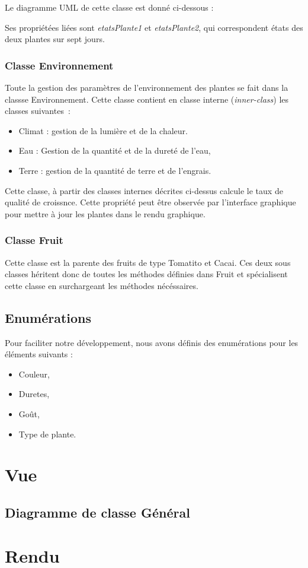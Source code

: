 \documentclass[a4paper,10pt]{article}
\begin{document}
Le diagramme UML de cette classe est donné ci-dessous :

Ses propriétées liées sont \textit{etatsPlante1} et \textit{etatsPlante2}, qui correspondent états des deux plantes
sur sept jours.


\subsubsection{Classe Environnement}
Toute la gestion des paramètres de l'environnement des plantes se fait dans la classse Environnement.
Cette classe contient en classe interne (\textit{inner-class}) les classes suivantes~:
\begin{itemize}
	\item Climat : gestion de la lumière et de la chaleur.
	\item Eau : Gestion de la quantité et de la dureté de l'eau,
	\item Terre : gestion de la quantité de terre et de l'engrais.
\end{itemize}

Cette classe, à partir des classes internes décrites ci-dessus calcule le taux de qualité de croissnce. Cette propriété peut être observée par l'interface graphique pour mettre à jour les plantes dans le rendu graphique.


\subsubsection{Classe Fruit}

Cette classe est la parente des fruits de type Tomatito et Cacai. Ces deux sous classes héritent donc de toutes les méthodes
définies dans Fruit et spécialisent cette classe en surchargeant les méthodes nécéssaires.

\subsection{Enumérations}

Pour faciliter notre développement, nous avons définis des enumérations pour les éléments suivants :
\begin{itemize}
 \item Couleur,
 \item Duretes,
 \item Goût,
 \item Type de plante.
\end{itemize}


\section{Vue}
\subsection{Diagramme de classe Général}
\section{Rendu}
\end{document}
